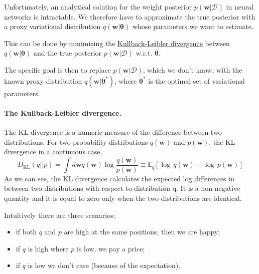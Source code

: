 \documentclass[%
oneside,                 %
final,                   %
10pt]{article}
\begin{document}
Unfortunately, an analytical solution for the weight posterior $p(\boldsymbol{w} \lvert \mathcal{D})$ in neural networks is intractable. We therefore have to approximate the true posterior with a proxy variational distribution $q(\boldsymbol{w} \lvert \boldsymbol{\theta})$ whose parameters we want to estimate. 

This can be done by minimizing the \href{{https://en.wikipedia.org/wiki/Kullback%E2%80%93Leibler_divergence}}{Kullback-Leibler divergence} between $q(\boldsymbol{w} \lvert \boldsymbol{\theta})$ and the true posterior $p(\boldsymbol{w} \lvert \mathcal{D})$  w.r.t. $\boldsymbol{\theta}$.

The specific goal is then to replace $p(\boldsymbol{w} \lvert \mathcal{D})$, which we don't know, with the known proxy distribution $q(\boldsymbol{w} \lvert \boldsymbol{\theta}^*)$, where $\boldsymbol{\theta}^*$ is the optimal set of variational parameters. 

\paragraph{The Kullback-Leibler divergence.}
The KL divergence is a numeric measure of the difference between two distributions. For two probability distributions $q(\boldsymbol{w})$ and $p(\boldsymbol{w})$, the KL divergence in a continuous case,
\[ D_\mathrm{KL}(q||p) = \int d \boldsymbol{w} q(\boldsymbol{w}) \log \frac{q(\boldsymbol{w})}{p(\boldsymbol{w})} \equiv \mathbb{E}_{q} \left[ \log \, q(\boldsymbol{w}) - \log \, p(\boldsymbol{w}) \right] \]
As we can see, the KL divergence calculates the expected log differences in between two distributions with respect to distribution q. It is a non-negative quantity and it is equal to zero only when the two distributions are identical.

Intuitively there are three scenarios:
\begin{itemize}
\item if both $q$ and $p$ are high at the same positions, then we are happy;

\item if $q$ is high where $p$ is low, we pay a price;

\item if $q$ is low we don't care (because of the expectation).
\end{itemize}
\end{document}
